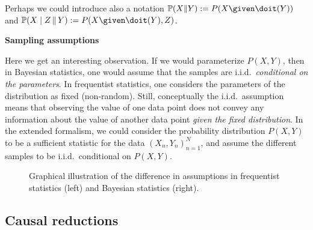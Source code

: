 Perhaps we could introduce also a notation $\mathbb{P}(X \Vert Y) := P(X \given \doit(Y))$ and $\mathbb{P}(X \mid Z \,\Vert\, Y) := P(X \given \doit(Y), Z)$.

\textbf{Sampling assumptions}

Here we get an interesting observation.
If we would parameterize $P(X,Y)$, then in Bayesian statistics, one would assume that the
samples are i.i.d.\ \emph{conditional on the parameters}. In frequentist statistics, one considers
the parameters of the distribution as fixed (non-random). Still, conceptually the i.i.d.\ assumption
means that observing the value of one data point does not convey any information about the value
of another data point \emph{given the fixed distribution}. In the extended formalism, we could 
consider the probability distribution $P(X,Y)$ to be a sufficient statistic for the data
$(X_n,Y_n)_{n=1}^N$, and assume the different samples to be i.i.d.\ conditional on $P(X,Y)$.

\begin{figure}\centering
{}
\caption{Graphical illustration of the difference in assumptions in frequentist statistics (left) and Bayesian statistics (right).}
\end{figure}

\subsection{Causal reductions}

